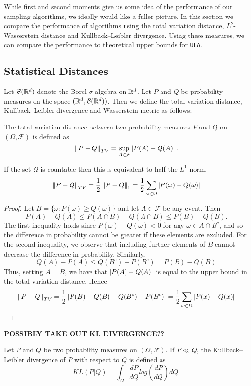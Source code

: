 While first and second moments give us some idea of the performance of our sampling algorithms, we ideally would like a fuller picture.  In this section we compare the performance of algorithms using the total variation distance, $L^2$-Wasserstein distance and Kullback--Leibler divergence.  Using these measures, we can compare the performance to theoretical upper bounds for \texttt{ULA}.

\subsection{Statistical Distances}
Let $\mathcal{B}(\mathbb{R}^d)$ denote the Borel $\sigma$-algebra on $\mathbb{R}^d$. Let $P$ and $Q$ be probability measures on the space $(\mathbb{R}^d, \mathcal{B}(\mathbb{R}^d))$.  Then we define the total variation distance, Kullback--Leibler divergence and Wasserstein metric as follows:

\begin{defn}
The total variation distance between two probability measures $P$ and $Q$ on $(\Omega, \mathcal{F})$ is defined as
$$
\norm{P - Q}_{TV} = \sup_{A \in \mathcal{F}} \abs{P(A) - Q(A)}.
$$
\end{defn}
\begin{prop}
If the set $\Omega$ is countable then this is equivalent to half the $L^1$ norm.
$$
\norm{P - Q}_{TV} = \frac{1}{2} \norm{P-Q}_1 = \frac{1}{2} \sum_{\omega \in \Omega} \abs{P(\omega) - Q(\omega)}
$$
\end{prop}
\begin{proof}
Let $B = \{\omega: P(\omega) \geq Q(\omega)\}$ and let $A \in \mathcal{F}$ be any event.  Then
$$
P(A) - Q(A) \leq P(A \cap B) - Q(A \cap B) \leq P(B) - Q(B).
$$
The first inequality holds since $P(\omega)-Q(\omega) < 0$ for any $\omega \in A \cap B^c$, and so the difference in probability cannot be greater if these elements are excluded.  For the second inequality, we observe that including further elements of $B$ cannot decrease the difference in probability.
Similarly,
$$
Q(A) - P(A) \leq Q(B^c) - P(B^c) = P(B) - Q(B)
$$
Thus, setting $A=B$, we have that $\abs{P(A)-Q(A)}$ is equal to the upper bound in the total variation distance.  Hence,
$$
\norm{P-Q}_{TV} = \frac{1}{2} \abs{P(B)-Q(B)+Q(B^c)-P(B^c)} = \frac{1}{2} \sum_{\omega \in \Omega} \abs{P(x)-Q(x)}
$$
\end{proof}


\textbf{POSSIBLY TAKE OUT KL DIVERGENCE??}


\begin{defn}
Let $P$ and $Q$ be two probability measures on $(\Omega, \mathcal{F})$.  If $P \ll Q$, the Kullback--Leibler divergence of $P$ with respect to $Q$ is defined as
$$
KL(P|Q) = \int_\Omega \frac{d P}{d Q} log \left(  \frac{d P}{d Q} \right) d Q.
$$
\end{defn}

